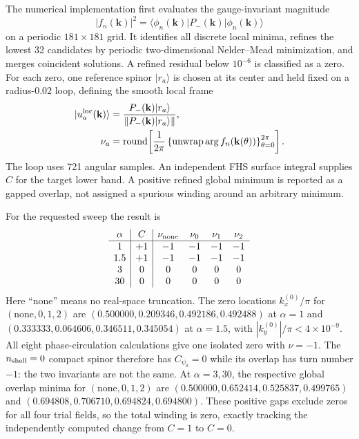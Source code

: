 \documentclass[aps,prb,twocolumn,floatfix,nofootinbib,superscriptaddress]{revtex4-2}
\begin{document}
The numerical implementation first evaluates the gauge-invariant magnitude
\begin{equation}
 |f_n(\mathbf{k})|^2=
 \langle\phi_n(\mathbf{k})|P_-(\mathbf{k})|\phi_n(\mathbf{k})\rangle
 \label{eq:legacy-overlap-magnitude}
\end{equation}
on a periodic $181\times181$ grid.  It identifies all discrete local minima, refines the
lowest 32 candidates by periodic two-dimensional Nelder--Mead minimization, and merges
coincident solutions.  A refined residual below $10^{-6}$ is classified as a zero.  For
each zero, one reference spinor $|r_a\rangle$ is chosen at its center and held fixed on a
radius-$0.02$ loop, defining the smooth local frame
\begin{equation}
 \begin{aligned}
 |u_a^{\rm loc}(\mathbf{k})\rangle
 &=\frac{P_-(\mathbf{k})|r_a\rangle}
 {\|P_-(\mathbf{k})|r_a\rangle\|},\\
 \nu_a
 &=\operatorname{round}\!\left[
 \frac{1}{2\pi}\left\{\operatorname{unwrap}\arg
 f_n(\mathbf{k}(\theta))\right\}_{\theta=0}^{2\pi}\right].
 \end{aligned}
 \label{eq:legacy-overlap-loop-algorithm}
\end{equation}
The loop uses 721 angular samples.  An independent FHS surface integral supplies $C$ for
the target lower band.  A positive refined global minimum is reported as a gapped overlap,
not assigned a spurious winding around an arbitrary minimum.

For the requested sweep the result is
\begin{equation}
\begin{array}{c|c|cccc}
\alpha&C&\nu_{\rm none}&\nu_0&\nu_1&\nu_2\\ \hline
1   &+1&-1&-1&-1&-1\\
1.5 &+1&-1&-1&-1&-1\\
3   &0&0&0&0&0\\
30  &0&0&0&0&0
\end{array}
\label{eq:legacy-overlap-alpha-sweep}
\end{equation}
Here ``none'' means no real-space truncation.  The zero locations
$k_x^{(0)}/\pi$ for $(\text{none},0,1,2)$ are
$(0.500000,0.209346,0.492186,0.492488)$ at $\alpha=1$ and
$(0.333333,0.064606,0.346511,0.345054)$ at $\alpha=1.5$, with
$|k_y^{(0)}|/\pi<4\times10^{-9}$.  All eight phase-circulation calculations give one
isolated zero with $\nu=-1$.  The $n_{\rm shell}=0$ compact spinor therefore has
$C_{\psi_0}=0$ while its overlap has turn number $-1$: the two invariants are not the same.
At $\alpha=3,30$, the respective global overlap minima for
$(\text{none},0,1,2)$ are
$(0.500000,0.652414,0.525837,0.499765)$ and
$(0.694808,0.706710,0.694824,0.694800)$.  These positive gaps exclude zeros for all four
trial fields, so the total winding is zero, exactly tracking the independently computed
change from $C=1$ to $C=0$.
\end{document}
